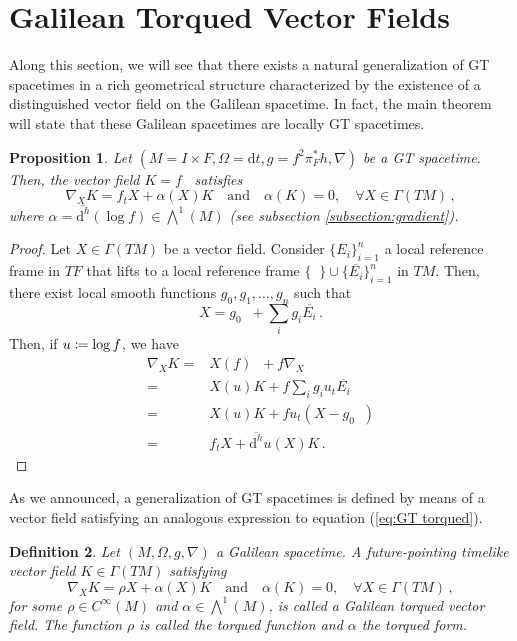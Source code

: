\documentclass[12pt]{article}
\newcommand{\diff}{\mathrm{d}}
\newcommand{\dt}{\diff t}
\newcommand{\quand}{\quad\text{and}\quad}
\newcommand{\coloneq}{\vcentcolon\mathrel{\mkern -1.2mu}\mathrel{=}}
\DeclareMathOperator{\pt}{\partial_t}
\newtheorem{defi}{Definition}[section]
\newtheorem{pro}[defi]{Proposition}
\begin{document}
\section{Galilean Torqued Vector Fields}\label{sect5}
Along this section, we will see that there exists a natural generalization of GT spacetimes in a rich geometrical structure characterized by the existence of a  distinguished  vector field on the Galilean spacetime. In fact, the main theorem will state that these Galilean spacetimes are locally GT spacetimes. 
\begin{pro}\label{pro:torqued vector field in GT}
    Let $(M=I\times F, \Omega = \dt, g = f^2 \pi_F^* h, \nabla)$ be a GT spacetime. Then, the vector field $K=f\pt$ satisfies
    \begin{equation}\label{eq:GT torqued}
        \nabla_X K = f_t X + \alpha(X) K \quand \alpha(K) = 0, \quad \forall X \in \Gamma(T M)\,,
    \end{equation}
    where $\alpha = \overline{\diff^h} (\log f) \in \bigwedge^1 (M)$ (see subsection \ref{subsection:gradient}).
\end{pro}
\begin{proof}
    Let $X\in \Gamma(TM)$ be a vector field. Consider $\{E_i\}_{i=1}^n$ a local reference frame in $TF$ that lifts to a local reference frame $\{\pt\}\cup \{\overline{E_i}\}_{i=1}^n$ in $TM$. Then, there exist local smooth functions $g_0,g_1,\ldots,g_n$ such that
    \begin{equation*}
        X=g_0 \pt + \sum_i g_i \overline{E_i}\,.
    \end{equation*}
    Then, if $u\coloneq \log f$, we have
    \begin{equation*}
    \begin{split}
        \nabla_X K ={}& X(f) \pt + f \nabla_X \pt \\
        ={}& X(u) K + f \sum_i g_i u_t \overline{E_i} \\
        ={}& X(u) K + f u_t (X-g_0\pt) \\
        ={}& f_t X + \overline{\diff^h} u(X) K\,.
    \end{split}
    \end{equation*}
\end{proof}

As we announced, a generalization of GT spacetimes is defined by means of a vector field satisfying an analogous expression to equation (\ref{eq:GT torqued}).
\begin{defi}\label{defi:torqued}
    Let $(M, \Omega, g, \nabla)$ a Galilean spacetime. A future-pointing timelike vector field $K \in \Gamma(TM)$ satisfying
    \begin{equation}\label{eq:torqued}
        \nabla_X K = \rho X + \alpha(X) K \quand \alpha(K) = 0, \quad \forall X \in \Gamma(T M)\,,
    \end{equation}
    for some $\rho\in C^\infty(M)$ and $\alpha \in  \bigwedge^1 (M)$, is called a \textup{Galilean torqued vector field}. The function $\rho$ is called the \textup{torqued function} and $\alpha$ the \textup{torqued form}.
\end{defi}
\end{document}
